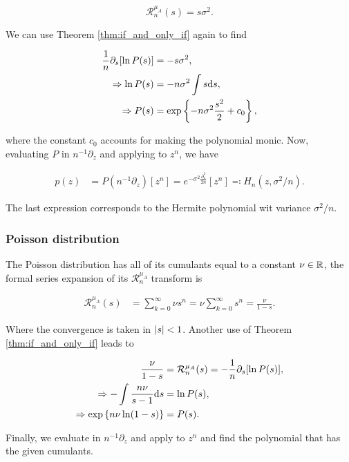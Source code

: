 \begin{equation*}
    \mathcal R_n^{\mu_A}(s) = s\sigma^2.
\end{equation*}

We can use Theorem \ref{thm:if_and_only_if} again to find

\begin{align*}
    \frac1n \partial_s[ \ln P(s) ] &= -s\sigma^2,\\ 
    \Rightarrow \ln P(s) &= -n\sigma^2 \int s \mathrm d s,\\
    \Rightarrow P(s) &= \exp\left\{ -n \sigma^2\frac {s^2}2 + c_0  \right\},
\end{align*}

\noindent where the constant $c_0$ accounts for making the polynomial monic. Now, evaluating $P$ in $n^{-1}\partial_z$ and applying to $z^n$, we have

\begin{align*}
    p(z) &= P(n^{-1}\partial_z)[z^n] = e^{-\sigma^2\frac{\partial_z^2}{2n}}[z^n] \eqcolon H_n(z,\sigma^2/n). 
\end{align*}

The last expression corresponds to the Hermite polynomial wit variance $\sigma^2/n$.

\subsubsection{Poisson distribution}

The Poisson distribution has all of its cumulants equal to a constant $\nu \in \mathbb R$, the formal series expansion of its $\mathcal R_n^{\mu_A}$ transform is 

\begin{align*}
    \mathcal R_n^{\mu_A}(s) &= \sum_{k=0}^\infty \nu s^n = \nu \sum_{k=0}^\infty s^n = \frac{\nu}{1-s}.
\end{align*}

Where the convergence is taken in $\lvert s \rvert < 1$. Another use of Theorem \ref{thm:if_and_only_if} leads to

\begin{align*}
    \frac{\nu}{1-s} &= \mathcal R_n^{\mu_A}(s) = -\frac1n\partial_s[\ln P(s)], \\
    \Rightarrow -\int \frac{n\nu}{s-1} \mathrm d s &= \ln P(s),\\
    \Rightarrow \exp\left\{ n\nu \ln (1-s) \right\} &= P(s).
\end{align*}

Finally, we evaluate in $n^{-1}\partial_z$ and apply to $z^n$ and find the polynomial that has the given cumulants.

